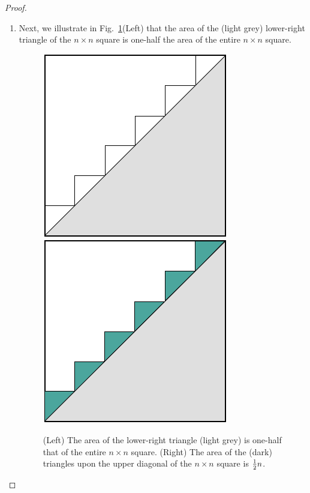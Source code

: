\begin{proof}
\begin{enumerate}
\item
Next, we illustrate in Fig.~\ref{fig:sumIntegersGeo2}(Left) that the area of the (light grey) lower-right triangle of the $n \times n$ square is one-half the area of the entire $n \times n$ square.
\begin{figure}[htb]
\begin{center}
       \includegraphics[scale=0.33]{FiguresMaths/SumIntegersGeometricIntermediate}
       \hspace*{.25in}
        \includegraphics[scale=0.33]{FiguresMaths/SumIntegersGeometricFinal}
\end{center}
\caption{(Left) The area of the lower-right triangle (light grey) is one-half that of the entire $n \times n$ square.  (Right) The area of the (dark) triangles upon the upper diagonal of the $n \times n$ square is ${1 \over2} n$.}
       \label{fig:sumIntegersGeo2}
\end{figure}


\end{enumerate}
\end{proof}
